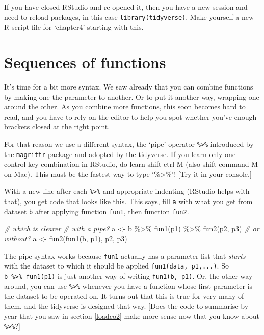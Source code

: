 \documentclass[
]{book}
\newenvironment{Shaded}{\begin{snugshade}}{\end{snugshade}}
\newcommand{\CommentTok}[1]{\textcolor[rgb]{0.56,0.35,0.01}{\textit{#1}}}
\newcommand{\FunctionTok}[1]{\textcolor[rgb]{0.00,0.00,0.00}{#1}}
\newcommand{\NormalTok}[1]{#1}
\newcommand{\OtherTok}[1]{\textcolor[rgb]{0.56,0.35,0.01}{#1}}
\newcommand{\SpecialCharTok}[1]{\textcolor[rgb]{0.00,0.00,0.00}{#1}}
\begin{document}
If you have closed RStudio and re-opened it, then you have a new session and need to reload packages, in this case \texttt{library(tidyverse)}. Make yourself a new R script file for `chapter4' starting with this.

\hypertarget{sequences-of-functions}{%
\section{Sequences of functions}\label{sequences-of-functions}}

It's time for a bit more syntax. We saw already that you can combine functions by making one the parameter to another. Or to put it another way, wrapping one around the other. As you combine more functions, this soon becomes hard to read, and you have to rely on the editor to help you spot whether you've enough brackets closed at the right point.

For that reason we use a different syntax, the `pipe' operator \texttt{\%\textgreater{}\%} introduced by the \texttt{magrittr} package and adopted by the tidyverse. If you learn only one control-key combination in RStudio, do learn shift-ctrl-M (also shift-command-M on Mac). This must be the fastest way to type `\%\textgreater\%'! {[}Try it in your console.{]}

With a new line after each \texttt{\%\textgreater{}\%} and appropriate indenting (RStudio helps with that), you get code that looks like this. This says, fill \texttt{a} with what you get from dataset \texttt{b} after applying function \texttt{fun1}, then function \texttt{fun2}.

\begin{Shaded}
\begin{Highlighting}[]
\CommentTok{\# which is clearer}
\CommentTok{\# with a pipe?}
\NormalTok{a }\OtherTok{\textless{}{-}}\NormalTok{ b }\SpecialCharTok{\%\textgreater{}\%} 
  \FunctionTok{fun1}\NormalTok{(p1) }\SpecialCharTok{\%\textgreater{}\%} 
  \FunctionTok{fun2}\NormalTok{(p2, p3)}
\CommentTok{\# or without?}
\NormalTok{a }\OtherTok{\textless{}{-}} \FunctionTok{fun2}\NormalTok{(}\FunctionTok{fun1}\NormalTok{(b, p1), p2, p3)}
\end{Highlighting}
\end{Shaded}

The pipe syntax works because \texttt{fun1} actually has a parameter list that \emph{starts} with the dataset to which it should be applied \texttt{fun1(data,\ p1,...)}. So \texttt{b\ \%\textgreater{}\%\ fun1(p1)} is just another way of writing \texttt{fun1(b,\ p1)}. Or, the other way around, you can use \texttt{\%\textgreater{}\%} whenever you have a function whose first parameter is the dataset to be operated on. It turns out that this is true for very many of them, and the tidyverse is designed that way. {[}Does the code to summarise by year that you saw in section \ref{loadco2} make more sense now that you know about \texttt{\%\textgreater{}\%}?{]}
\end{document}
